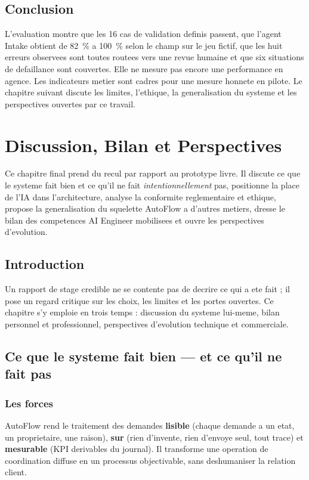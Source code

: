 \documentclass[12pt,a4paper,openany]{report}
\begin{document}
\section{Conclusion}

L'evaluation montre que les 16 cas de validation definis passent, que l'agent Intake obtient de 82~\% a 100~\% selon le champ sur le jeu fictif, que les huit erreurs observees sont toutes routees vers une revue humaine et que six situations de defaillance sont couvertes. Elle ne mesure pas encore une performance en agence. Les indicateurs metier sont cadres pour une mesure honnete en pilote. Le chapitre suivant discute les limites, l'ethique, la generalisation du systeme et les perspectives ouvertes par ce travail.

\chapter{Discussion, Bilan et Perspectives}\label{chap:discussion}
Ce chapitre final prend du recul par rapport au prototype livre. Il discute ce que le systeme fait bien et ce qu'il ne fait \emph{intentionnellement} pas, positionne la place de l'IA dans l'architecture, analyse la conformite reglementaire et ethique, propose la generalisation du squelette AutoFlow a d'autres metiers, dresse le bilan des competences AI Engineer mobilisees et ouvre les perspectives d'evolution.

\section{Introduction}
Un rapport de stage credible ne se contente pas de decrire ce qui a ete fait ; il pose un regard critique sur les choix, les limites et les portes ouvertes. Ce chapitre s'y emploie en trois temps : discussion du systeme lui-meme, bilan personnel et professionnel, perspectives d'evolution technique et commerciale.

\section{Ce que le systeme fait bien --- et ce qu'il ne fait pas}

\subsection{Les forces}
AutoFlow rend le traitement des demandes \textbf{lisible} (chaque demande a un etat, un proprietaire, une raison), \textbf{sur} (rien d'invente, rien d'envoye seul, tout trace) et \textbf{mesurable} (KPI derivables du journal). Il transforme une operation de coordination diffuse en un processus objectivable, sans deshumaniser la relation client.
\end{document}
